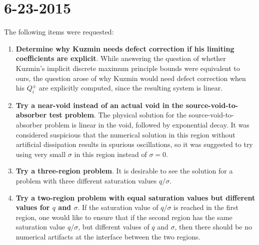 \section*{6-23-2015}

The following items were requested:
\begin{enumerate}

\item \textbf{Determine why Kuzmin needs defect correction if his limiting
coefficients are explicit}.
While answering the question of whether Kuzmin's implicit discrete maximum
principle bounds were equivalent to ours, the question arose of why Kuzmin
would need defect correction when his $Q_i^\pm$ are explicitly computed,
since the resulting system is linear.

\item \textbf{Try a near-void instead of an actual void in the
source-void-to-absorber test problem}.
The physical solution for the source-void-to-absorber problem is linear
in the void, followed by exponential decay. It was considered
suspicious that the numerical solution in this region without 
artificial dissipation results in spurious oscillations, so
it was suggested to try using very small $\sigma$ in this
region instead of $\sigma=0$.

\item \textbf{Try a three-region problem}.
It is desirable to see the solution for a problem with three
different saturation values $q/\sigma$.

\item \textbf{Try a two-region problem with equal saturation values
but different values for $q$ and $\sigma$}.
If the saturation value of $q/\sigma$ is reached in the first
region, one would like to ensure that if the second region has
the same saturation value $q/\sigma$, but different values of
$q$ and $\sigma$, then there should be no numerical artifacts at
the interface between the two regions.

\end{enumerate}
